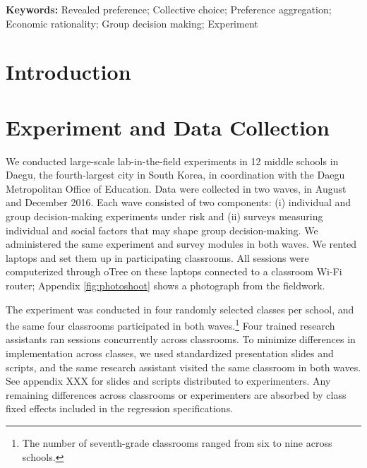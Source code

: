 \documentclass[11 pt]{article}
\begin{document}
\strut

\textbf{Keywords:} Revealed preference; Collective choice; Preference aggregation; Economic rationality; Group decision making; Experiment

\strut


\doublespacing %


\section{Introduction}
\label{sec:introduction}





\section{Experiment and Data Collection}
\label{sec:data_collection}

We conducted large-scale lab-in-the-field experiments in 12 middle schools in Daegu, the fourth-largest city in South Korea, in coordination with the Daegu Metropolitan Office of Education. Data were collected in two waves, in August  and December 2016. Each wave consisted of two components: (i) individual and group decision-making experiments under risk and (ii) surveys measuring individual and social factors that may shape group decision-making. We administered the same experiment and survey modules in both waves. We rented laptops and set them up in participating classrooms. All sessions were computerized through oTree \citep{Chenetal:2015:JBEF} on these laptops connected to a classroom Wi-Fi router; Appendix \autoref{fig:photoshoot} shows a photograph from the fieldwork.

The experiment was conducted in four randomly selected classes per school, and the same four classrooms participated in both waves.\footnote{The number of seventh-grade classrooms ranged from six to nine across schools.} Four trained research assistants ran sessions concurrently across classrooms. To minimize differences in implementation across classes, we used standardized presentation slides and scripts, and the same research assistant visited the same classroom in both waves. See appendix XXX for slides and scripts distributed to experimenters. Any remaining differences across classrooms or experimenters are absorbed by class fixed effects included in the regression specifications.
\end{document}
